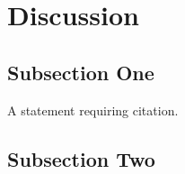 \documentclass[twoside,twocolumn,a4paper,11pt,english]{article}
\begin{document}
\blindtext %


\section{Discussion}

\subsection{Subsection One}

A statement requiring citation.
\blindtext %

\subsection{Subsection Two}

\blindtext %





\end{document}
